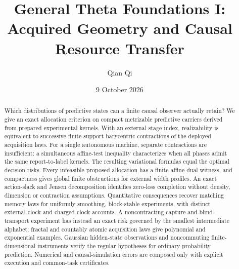 \documentclass[11pt]{amsart}
\title{General Theta Foundations I:\\Acquired Geometry and Causal Resource Transfer}
\author{Qian Qi}\date{9 October 2026}
\theoremstyle{definition}\newtheorem{definition}[theorem]{Definition}
\theoremstyle{remark}\newtheorem{remark}[theorem]{Remark}
\begin{document}
\begin{abstract}
Which distributions of predictive states can a finite causal observer actually retain? We give an exact allocation criterion on compact metrizable predictive carriers derived from prepared experimental kernels. With an external stage index, realizability is equivalent to successive finite-support barycentric contractions of the deployed acquisition laws. For a single autonomous machine, separate contractions are insufficient: a simultaneous affine-test inequality characterizes when all phases admit the same report-to-label kernels. The resulting variational formulas equal the optimal decision risks. Every infeasible proposed allocation has a finite affine dual witness, and compactness gives global finite obstructions for external width profiles. An exact action-slack and Jensen decomposition identifies zero-loss completion without density, dimension or contraction assumptions. Quantitative consequences recover matching memory laws for uniformly smoothing, block-stable experiments, with distinct external-clock and charged-clock accounts. A noncontracting capture-and-blind-transport experiment has instead an exact risk governed by the smallest intermediate alphabet; fractal and countably atomic acquisition laws give polynomial and exponential examples. Gaussian hidden-state observations and noncommuting finite-dimensional instruments verify the regular hypotheses for ordinary probability prediction. Numerical and causal-simulation errors are composed only with explicit execution and common-task certificates.
\end{abstract}
\maketitle










\appendix


\end{document}
